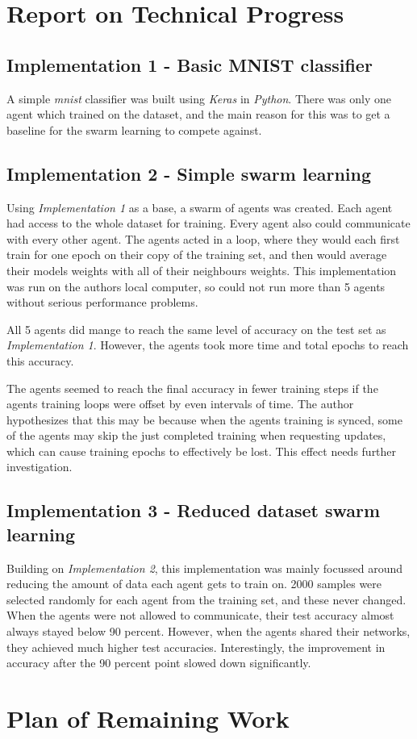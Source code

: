 \documentclass[12pt,a4paper,titlepage]{report}
\begin{document}
	\chapter{Report on Technical Progress}
	\section{Implementation 1 - Basic MNIST classifier}
	A simple \emph{mnist} classifier was built using \emph{Keras} in \emph{Python}. There was only one agent which trained on the dataset, and the main reason for this was to get a baseline for the swarm learning to compete against.
	\section{Implementation 2 - Simple swarm learning}
	Using \emph{Implementation 1} as a base, a swarm of agents was created. Each agent had access to the whole dataset for training. Every agent also could communicate with every other agent. The agents acted in a loop, where they would each first train for one epoch on their copy of the training set, and then would average their models weights with all of their neighbours weights. This implementation was run on the authors local computer, so could not run more than 5 agents without serious performance problems.
	
	All 5 agents did mange to reach the same level of accuracy on the test set as \emph{Implementation 1}. However, the agents took more time and total epochs to reach this accuracy.
	
	The agents seemed to reach the final accuracy in fewer training steps if the agents training loops were offset by even intervals of time. The author hypothesizes that this may be because when the agents training is synced, some of the agents may skip the just completed training when requesting updates, which can cause training epochs to effectively be lost. This effect needs further investigation.
	\section{Implementation 3 - Reduced dataset swarm learning}
	Building on \emph{Implementation 2}, this implementation was mainly focussed around reducing the amount of data each agent gets to train on. 2000 samples were selected randomly for each agent from the training set, and these never changed. When the agents were not allowed to communicate, their test accuracy almost always stayed below 90 percent. However, when the agents shared their networks, they achieved much higher test accuracies. Interestingly, the improvement in accuracy after the 90 percent point slowed down significantly.
	
	\chapter{Plan of Remaining Work}
	
	
	{}
\end{document}
